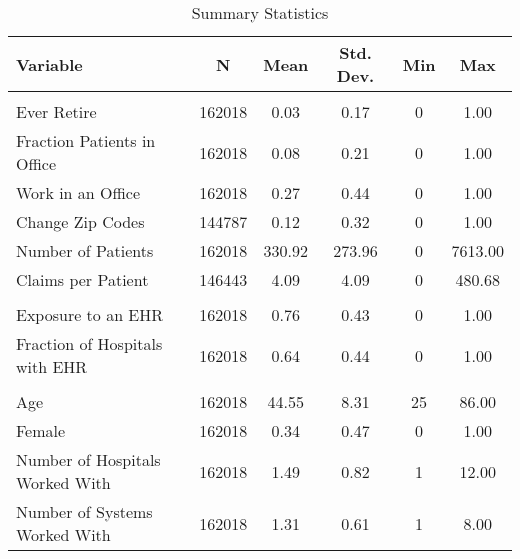 


\begin{table}[ht]

\caption{Summary Statistics}
\centering
\begin{tabular}[t]{lccccc}
\toprule
Variable & N & Mean & Std. Dev. & Min & Max\\
\midrule
\addlinespace[0.3em]
\multicolumn{6}{l}{\textbf{Outcomes}}\\
\hspace{1em}Ever Retire & 162018 & 0.03 & 0.17 & 0 & 1.00\\
\hspace{1em}Fraction Patients in Office & 162018 & 0.08 & 0.21 & 0 & 1.00\\
\hspace{1em}Work in an Office & 162018 & 0.27 & 0.44 & 0 & 1.00\\
\hspace{1em}Change Zip Codes & 144787 & 0.12 & 0.32 & 0 & 1.00\\
\hspace{1em}Number of Patients & 162018 & 330.92 & 273.96 & 0 & 7613.00\\
\hspace{1em}Claims per Patient & 146443 & 4.09 & 4.09 & 0 & 480.68\\
\addlinespace[0.3em]
\multicolumn{6}{l}{\textbf{Treatment}}\\
\hspace{1em}Exposure to an EHR & 162018 & 0.76 & 0.43 & 0 & 1.00\\
\hspace{1em}Fraction of Hospitals with EHR & 162018 & 0.64 & 0.44 & 0 & 1.00\\
\addlinespace[0.3em]
\multicolumn{6}{l}{\textbf{Characteristics}}\\
\hspace{1em}Age & 162018 & 44.55 & 8.31 & 25 & 86.00\\
\hspace{1em}Female & 162018 & 0.34 & 0.47 & 0 & 1.00\\
\hspace{1em}Number of Hospitals Worked With & 162018 & 1.49 & 0.82 & 1 & 12.00\\
\hspace{1em}Number of Systems Worked With & 162018 & 1.31 & 0.61 & 1 & 8.00\\
\bottomrule
\end{tabular}
\end{table}
\label{tab:sumstats}